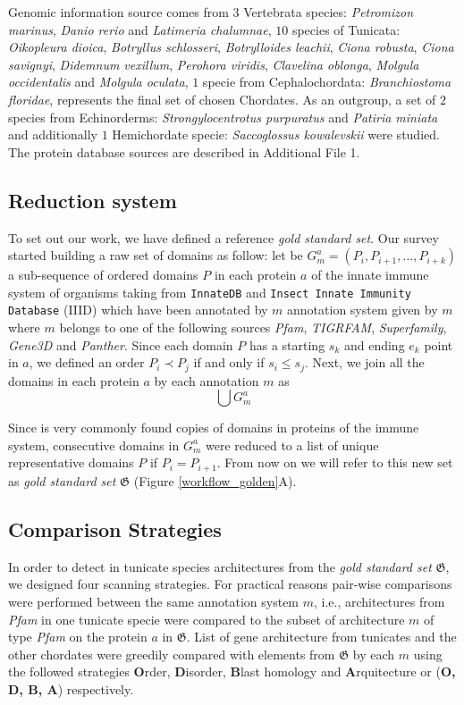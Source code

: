 \documentclass[11pt]{article}
\begin{document}
Genomic information source comes from $3$ Vertebrata species:
\textit{Petromizon marinus}, \textit{Danio rerio} and 
\textit{Latimeria chalumnae}, $10$ species of Tunicata: \textit{Oikopleura 
dioica}, \textit{Botryllus schlosseri}, \textit{Botrylloides 
leachii}, \textit{Ciona robusta}, \textit{Ciona savignyi}, \textit{Didemnum 
vexillum}, \textit{Perohora viridis}, \textit{Clavelina oblonga}, 
\textit{Molgula occidentalis} and \textit{Molgula oculata}, $1$ specie 
from Cephalochordata: \textit{Branchiostoma floridae}, represents the final set 
of chosen Chordates. As an outgroup, a set of $2$ species from Echinorderms: 
\textit{Strongylocentrotus purpuratus} and \textit{Patiria miniata} and 
additionally $1$ Hemichordate specie: \textit{Saccoglossus kowalevskii} were 
studied. The protein database sources are described in Additional File 1. 

\subsection*{Reduction system} \label{reduction}
To set out our work, we have defined a reference \textsl{gold standard set}. 
Our survey started building a raw set of domains as follow: let be $G^{a}_{m} = 
(P_i,P_{i+1},\ldots,P_{i+k})$ a sub-sequence of ordered domains $P$ in each 
protein $a$ of the innate immune system of organisms taking from 
\texttt{InnateDB} and \texttt{Insect Innate Immunity Database} (IIID) which have 
been annotated by $m$ annotation system given by $m$ where $m$ belongs to one of 
the following sources \textsl{Pfam}, \textsl{TIGRFAM}, \textsl{Superfamily}, 
\textsl{Gene3D} and \textsl{Panther}. Since each domain $P$ has a starting $s_k$ 
and ending $e_k$ point in $a$, we defined an order $P_i \prec P_j$ if and only 
if $s_i \le s_j$. Next, we join all the domains in each protein $a$ by each 
annotation $m$ as \[\bigcup G^{a}_{m}\]

Since is very commonly found copies of domains in proteins of the immune 
system, consecutive domains in $G^{a}_{m}$ were reduced to a list of unique 
representative domains $P$ if $P_i = P_{i+1}$. From now on we will refer to this 
new set as \textsl{gold standard set} $\boldsymbol{\mathfrak{G}}$ (Figure 
\ref{workflow_golden}A).

\subsection*{Comparison Strategies} \label{comparison}
In order to detect in tunicate species architectures from the \textsl{gold 
standard set} $\boldsymbol{\mathfrak{G}}$, we designed four scanning 
strategies. For practical reasons pair-wise comparisons were performed between 
the same annotation system $m$, i.e., architectures from \textsl{Pfam} in one 
tunicate specie were compared to the subset of architecture $m$ of type 
\textsl{Pfam} on the protein $a$ in $\boldsymbol{\mathfrak{G}}$. List of gene 
architecture from tunicates and the other chordates were greedily compared with 
elements from $\boldsymbol{\mathfrak{G}}$ by each $m$ using the followed 
strategies \textbf{O}rder, \textbf{D}isorder, \textbf{B}last homology and 
\textbf{A}rquitecture or (\textbf{O, D, B, A}) respectively.
\end{document}
